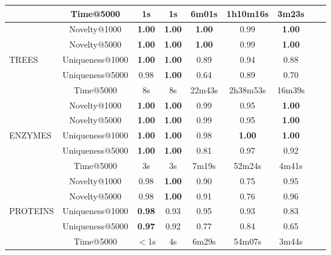 \begin{table}[h!]
\begin{tabular}{lcccccccc}
          & Time@5000                 & 1s   & 1s   & 6m01s & 1h10m16s & 3m23s\\
        \midrule
          & Novelty@1000              & \textbf{1.00} & \textbf{1.00} & \textbf{1.00}   & 0.99     & \textbf{1.00}\\
          & Novelty@5000              & \textbf{1.00} & \textbf{1.00} & \textbf{1.00}   & 0.99     & \textbf{1.00}\\
          TREES & Uniqueness@1000     & \textbf{1.00} & \textbf{1.00} & 0.89   & 0.94     & 0.88\\
          & Uniqueness@5000           & 0.98 & \textbf{1.00} & 0.64   & 0.89     & 0.70\\
          & Time@5000                 & 8s   & 8s   & 22m43s & 2h38m53s & 16m39s\\
         \midrule
          & Novelty@1000              & \textbf{1.00} & \textbf{1.00} & 0.99 & 0.95    & \textbf{1.00}\\
          & Novelty@5000              & \textbf{1.00} & \textbf{1.00} & 0.99 & 0.95    & \textbf{1.00}\\
          ENZYMES & Uniqueness@1000   & \textbf{1.00} & \textbf{1.00} & 0.98 & \textbf{1.00}    & \textbf{1.00}\\
          & Uniqueness@5000           & \textbf{1.00} & \textbf{1.00} & 0.81  & 0.97   & 0.92\\
          & Time@5000                 & 3s   & 3s   & 7m19s & 52m24s & 4m41s\\
        \midrule
          & Novelty@1000              & 0.98  & \textbf{1.00} & 0.90  & 0.75   & 0.95\\
          & Novelty@5000              & 0.98  & \textbf{1.00} & 0.91  & 0.76   & 0.96\\
          PROTEINS & Uniqueness@1000   & \textbf{0.98}  & 0.93 & 0.95  & 0.93   & 0.83\\
          & Uniqueness@5000           & \textbf{0.97}  & 0.92 & 0.77  & 0.84   & 0.65\\
          & Time@5000                 & $<$1s & 4s   & 6m29s & 54m07s & 3m44s\\
          \bottomrule
    \end{tabular}
\end{table}